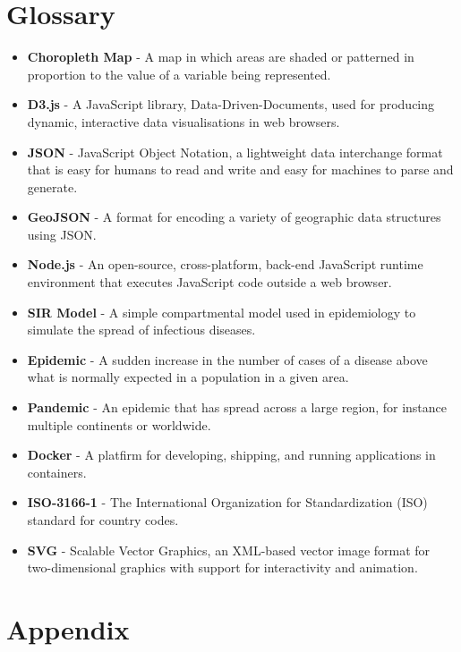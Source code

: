 \documentclass{report}
\begin{document}
\chapter{Glossary}
\begin{itemize}
    \item \textbf{Choropleth Map} - A map in which areas are shaded or patterned in proportion to the value of a variable being represented.
    \item \textbf{D3.js} - A JavaScript library, Data-Driven-Documents, used for producing dynamic, interactive data visualisations in web browsers.
    \item \textbf{JSON} - JavaScript Object Notation, a lightweight data interchange format that is easy for humans to read and write and easy for machines to parse and generate.
    \item \textbf{GeoJSON} - A format for encoding a variety of geographic data structures using JSON.
    \item \textbf{Node.js} - An open-source, cross-platform, back-end JavaScript runtime environment that executes JavaScript code outside a web browser.
    \item \textbf{SIR Model} - A simple compartmental model used in epidemiology to simulate the spread of infectious diseases.
    \item \textbf{Epidemic} - A sudden increase in the number of cases of a disease above what is normally expected in a population in a given area.
    \item \textbf{Pandemic} - An epidemic that has spread across a large region, for instance multiple continents or worldwide.
    \item \textbf{Docker} - A platfirm for developing, shipping, and running applications in containers.
    \item \textbf{ISO-3166-1} - The International Organization for Standardization (ISO) standard for country codes.
    \item \textbf{SVG} - Scalable Vector Graphics, an XML-based vector image format for two-dimensional graphics with support for interactivity and animation.
\end{itemize}
\newpage

\newpage

\chapter{Appendix}
\end{document}
